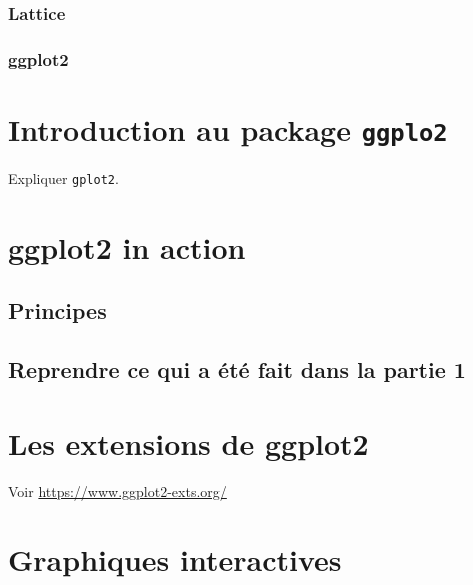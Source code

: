 \documentclass[]{article}
\begin{document}
\hypertarget{lattice}{%
\subsubsection{Lattice}\label{lattice}}

\hypertarget{ggplot2}{%
\subsubsection{ggplot2}\label{ggplot2}}

\hypertarget{introduction-au-package-ggplo2}{%
\section{\texorpdfstring{Introduction au package \texttt{ggplo2}}{Introduction au package ggplo2}}\label{introduction-au-package-ggplo2}}

Expliquer \texttt{gplot2}.

\hypertarget{ggplot2-in-action}{%
\section{ggplot2 in action}\label{ggplot2-in-action}}

\hypertarget{principes-1}{%
\subsection{Principes}\label{principes-1}}

\hypertarget{reprendre-ce-qui-a-uxe9tuxe9-fait-dans-la-partie-1}{%
\subsection{Reprendre ce qui a été fait dans la partie 1}\label{reprendre-ce-qui-a-uxe9tuxe9-fait-dans-la-partie-1}}

\hypertarget{les-extensions-de-ggplot2}{%
\section{Les extensions de ggplot2}\label{les-extensions-de-ggplot2}}

Voir \url{https://www.ggplot2-exts.org/}

\hypertarget{graphiques-interactives}{%
\section{Graphiques interactives}\label{graphiques-interactives}}
\end{document}

